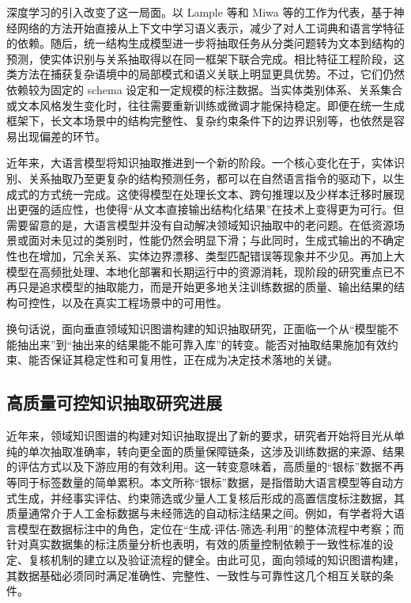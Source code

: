深度学习的引入改变了这一局面。以 Lample 等\cite{Lample2016NeuralArchitecturesNER}和 Miwa 等\cite{Miwa2016EndToEndRE}的工作为代表，基于神经网络的方法开始直接从上下文中学习语义表示，减少了对人工词典和语言学特征的依赖。随后，统一结构生成模型进一步将抽取任务从分类问题转为文本到结构的预测，使实体识别与关系抽取得以在同一框架下联合完成\cite{Lu2022UIE,HuguetCabot2021REBEL}。相比特征工程阶段，这类方法在捕获复杂语境中的局部模式和语义关联上明显更具优势。不过，它们仍然依赖较为固定的 schema 设定和一定规模的标注数据。当实体类别体系、关系集合或文本风格发生变化时，往往需要重新训练或微调才能保持稳定。即便在统一生成框架下，长文本场景中的结构完整性、复杂约束条件下的边界识别等，也依然是容易出现偏差的环节。

近年来，大语言模型将知识抽取推进到一个新的阶段。一个核心变化在于，实体识别、关系抽取乃至更复杂的结构预测任务，都可以在自然语言指令的驱动下，以生成式的方式统一完成\cite{Xu2024LLMGenerativeIESurvey,Wang2023InstructUIE,DiazGarcia2025RESurveyLanguageModels}。这使得模型在处理长文本、跨句推理以及少样本迁移时展现出更强的适应性，也使得“从文本直接输出结构化结果”在技术上变得更为可行。但需要留意的是，大语言模型并没有自动解决领域知识抽取中的老问题。在低资源场景或面对未见过的类别时，性能仍然会明显下滑\cite{Deng2024LowResourceIESurvey}；与此同时，生成式输出的不确定性也在增加，冗余关系、实体边界漂移、类型匹配错误等现象并不少见。再加上大模型在高频批处理、本地化部署和长期运行中的资源消耗，现阶段的研究重点已不再只是追求模型的抽取能力，而是开始更多地关注训练数据的质量、输出结果的结构可控性，以及在真实工程场景中的可用性。

换句话说，面向垂直领域知识图谱构建的知识抽取研究，正面临一个从“模型能不能抽出来”到“抽出来的结果能不能可靠入库”的转变。能否对抽取结果施加有效约束、能否保证其稳定性和可复用性，正在成为决定技术落地的关键。

\subsection{高质量可控知识抽取研究进展}

近年来，领域知识图谱的构建对知识抽取提出了新的要求，研究者开始将目光从单纯的单次抽取准确率，转向更全面的质量保障链条，这涉及训练数据的来源、结果的评估方式以及下游应用的有效利用。这一转变意味着，高质量的“银标”数据不再等同于标签数量的简单累积。本文所称“银标”数据，是指借助大语言模型等自动方式生成，并经事实评估、约束筛选或少量人工复核后形成的高置信度标注数据，其质量通常介于人工金标数据与未经筛选的自动标注结果之间。例如，有学者将大语言模型在数据标注中的角色，定位在“生成-评估-筛选-利用”的整体流程中考察\cite{Tan2024LLMDataAnnotationSurvey}；而针对真实数据集的标注质量分析也表明，有效的质量控制依赖于一致性标准的设定、复核机制的建立以及验证流程的健全\cite{Klie2024AnalyzingAnnotationQualityManagement}。由此可见，面向领域的知识图谱构建，其数据基础必须同时满足准确性、完整性、一致性与可靠性这几个相互关联的条件。

